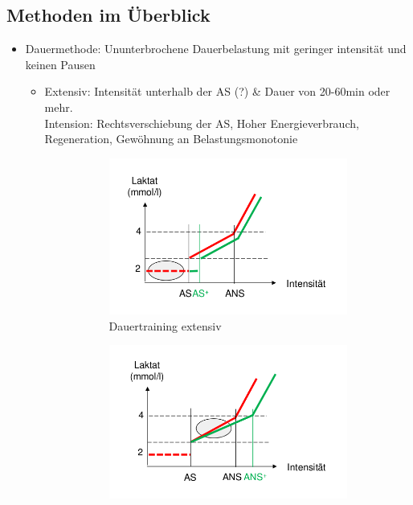 \subsection{Methoden im Überblick}
\begin{itemize}
  \item Dauermethode: Ununterbrochene Dauerbelastung mit geringer intensität und keinen Pausen
    \begin{itemize}
      \item Extensiv: Intensität unterhalb der AS (?) \& Dauer von 20-60min oder mehr.\\ 
        Intension: Rechtsverschiebung der AS, Hoher Energieverbrauch, Regeneration, Gewöhnung an Belastungsmonotonie \\
        \begin{figure}[H]
          \centering
          \begin{subfigure}[b]{0.4\textwidth}
            \includegraphics[width=\textwidth]{pictures/dauertraining_extensiv.png}
            \caption{Dauertraining extensiv}
          \end{subfigure}
          \begin{subfigure}[b]{0.4\textwidth}
            \includegraphics[width=\textwidth]{pictures/dauertraining_intensiv.png}

\end{subfigure}
\end{figure}
\end{itemize}
\end{itemize}

